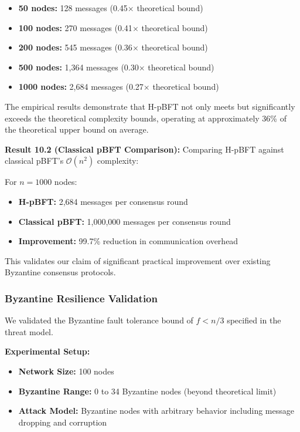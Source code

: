 \documentclass[conference]{IEEEtran}
\newcommand{\bigO}{\mathcal{O}}
\begin{document}
\begin{itemize}
    \item \textbf{50 nodes:} 128 messages (0.45$\times$ theoretical bound)
    \item \textbf{100 nodes:} 270 messages (0.41$\times$ theoretical bound) 
    \item \textbf{200 nodes:} 545 messages (0.36$\times$ theoretical bound)
    \item \textbf{500 nodes:} 1,364 messages (0.30$\times$ theoretical bound)
    \item \textbf{1000 nodes:} 2,684 messages (0.27$\times$ theoretical bound)
\end{itemize}

The empirical results demonstrate that H-pBFT not only meets but significantly exceeds the theoretical complexity bounds, operating at approximately 36\% of the theoretical upper bound on average.

\textbf{Result 10.2 (Classical pBFT Comparison):} Comparing H-pBFT against classical pBFT's $\bigO(n^2)$ complexity:

For $n = 1000$ nodes:
\begin{itemize}
    \item \textbf{H-pBFT:} 2,684 messages per consensus round
    \item \textbf{Classical pBFT:} 1,000,000 messages per consensus round
    \item \textbf{Improvement:} 99.7\% reduction in communication overhead
\end{itemize}

This validates our claim of significant practical improvement over existing Byzantine consensus protocols.

\subsubsection{Byzantine Resilience Validation}

We validated the Byzantine fault tolerance bound of $f < n/3$ specified in the threat model.

\textbf{Experimental Setup:}
\begin{itemize}
    \item \textbf{Network Size:} 100 nodes
    \item \textbf{Byzantine Range:} 0 to 34 Byzantine nodes (beyond theoretical limit)
    \item \textbf{Attack Model:} Byzantine nodes with arbitrary behavior including message dropping and corruption
\end{itemize}
\end{document}
